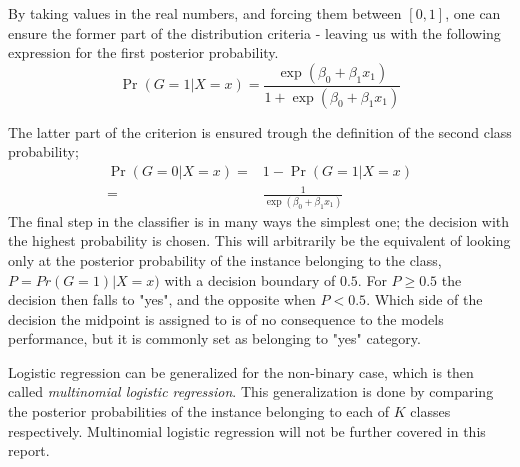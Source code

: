 By taking values in the real numbers, and forcing them between $[0,1]$, one can ensure the former part of the distribution criteria - leaving us with the following expression for the first posterior probability. 
\begin{equation}\label{priprob1}
\Pr(G=1|X=x)=\frac{\exp(\beta_0+\beta_1x_1)}{1+\exp(\beta_0+\beta_1x_1)}
\end{equation}

The latter part of the criterion is ensured trough the definition of the second class probability;
\begin{align}\label{priprob0}
    \Pr(G=0|X=x)=&1-\Pr(G=1|X=x) \\ =& 
    \frac{1}{\exp(\beta_0+\beta_1x_1)}
\end{align}
The final step in the classifier is in many ways the simplest one; the decision with the highest probability is chosen. This will arbitrarily be the equivalent of looking only at the posterior probability of the instance belonging to the class, $P=Pr(G=1)|X=x)$ with a decision boundary of $0.5$. For $P\geq0.5$ the decision then falls to "yes", and the opposite when $P<0.5$. 
Which side of the decision the midpoint is assigned to is of no consequence to the models performance, but it is commonly set as belonging to "yes" category.



Logistic regression can be generalized for the non-binary case, which is then called \textit{multinomial logistic regression}. This generalization is done by comparing the posterior probabilities of the instance belonging to each of $K$ classes respectively. Multinomial logistic regression will not be further covered in this report. 



